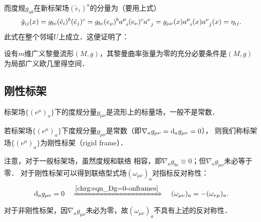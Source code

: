 而度规$g_{ab}$在新标架场$(\tilde{e}_i)^a$的分量为（要用上式）
\begin{equation}
    \tilde{g}_{ij}(x)=g_{bc} (\tilde{e}_i)^b(\tilde{e}_j)^c
    = g_{bc} (e_\mu)^{b} a_{\hphantom{\mu} i}^{\mu} (e_\nu)^{c} a_{\hphantom{\mu} j}^{\nu}
    = g_{\mu\nu}(x) a_{\hphantom{\mu} i}^{\mu}(x)  a_{\hphantom{\mu} j}^{\nu}(x) = \eta_{ij}.
\end{equation}
此式在整个邻域$U$上成立．这便证明了：
\begin{theorem}\label{chrg:thm_local-EuclideanSpace}
    设有$m$维广义黎曼流形$(M,g)$，其黎曼曲率张量为零的充分必要条件是$(M,g)$为局部广义欧几里得空间．
\end{theorem}




\subsection{刚性标架}\label{chrg:sec_rigid-frame}
标架场$\{(e^\mu)_{a}\}$下的度规分量$g_{\mu\nu}$是流形上的标量场，一般不是常数．
\begin{definition}\label{chrg:def_rigid-frame}
    若标架场$\{(e^\mu)_{a}\}$下度规分量$g_{\mu\nu}$是常数（即$\nabla_a g_{\mu\nu}={\rm d}_a g_{\mu\nu}=0$），
    则我们称标架场$\{(e^\mu)_{a}\}$为{\heiti 刚性标架}（rigid frame）．
\end{definition}
注意，对于一般标架场，虽然度规和联络
相容，即$\nabla_a g_{bc}\equiv0$；但$\nabla_a g_{\mu\nu}$未必等于零．
对于刚性标架可以得到联络型式场$(\omega _{\mu\nu})_{a}$对指标反对称性：
\begin{equation}\label{chrg:eqn_omega-anti}
    {\rm d}_a g_{\mu\nu}=0 \quad \xRightarrow{\ref{chrg:eqn_Dg=0-onframes}}\quad
    (\omega _{\mu\nu})_{a} = -(\omega _{\nu\mu})_{a} .
\end{equation}
对于非刚性标架，因$\nabla_a g_{\mu\nu}$未必为零，故$(\omega _{\mu\nu})_{a}$不具有上述的反对称性．


